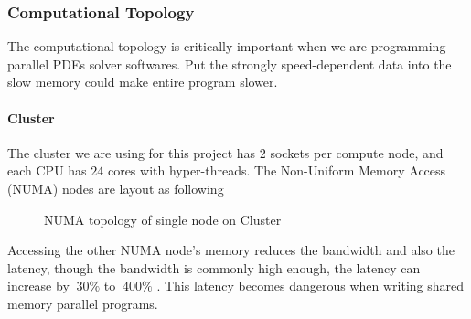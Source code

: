 \subsubsection{Computational Topology}
The computational topology is critically important when we are programming parallel PDEs solver softwares.
Put the strongly speed-dependent data into the slow memory could make entire program slower.

\paragraph{Cluster}
The cluster we are using for this project has 
$2$ sockets per compute node, and each CPU has $24$ cores with hyper-threads. 
The Non-Uniform Memory Access (NUMA) nodes are layout as following 
\begin{figure}[htbp]
  \centering
  \caption{NUMA topology of single node on Cluster}
  \label{FIG_Topology_Callan}
\end{figure}
Accessing the other NUMA node's memory reduces the bandwidth and also the latency,
though the bandwidth is commonly high enough, the latency can increase by 
$~30\%$ to $~400\%$ \cite{NUMA_Latency_TCD}. 
This latency becomes dangerous when writing shared memory parallel programs.


